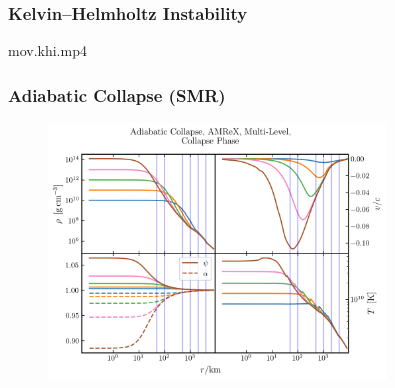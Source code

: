 \documentclass{beamer}
\begin{document}
\begin{frame}
\frametitle{Kelvin--Helmholtz Instability}

  \begin{center}
    {mov.khi.mp4}
  \end{center}

\end{frame}

\begin{frame}
\frametitle{Adiabatic Collapse (SMR)}

  \begin{figure}[htb!]
    \centering
    \includegraphics[width=0.8\textwidth]{fig.Collapse.png}
  \end{figure}

\end{frame}
\end{document}
